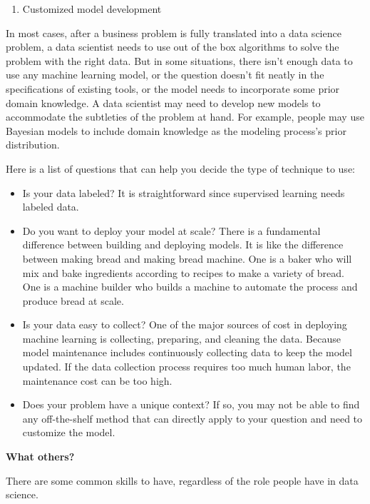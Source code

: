 \documentclass[12pt,]{krantz}
\providecommand{\tightlist}{%
  \setlength{\itemsep}{0pt}\setlength{\parskip}{0pt}}
\begin{document}
\begin{enumerate}
\def\labelenumi{(\arabic{enumi})}
\setcounter{enumi}{2}
\tightlist
\item
  Customized model development
\end{enumerate}

In most cases, after a business problem is fully translated into a data science problem, a data scientist needs to use out of the box algorithms to solve the problem with the right data. But in some situations, there isn't enough data to use any machine learning model, or the question doesn't fit neatly in the specifications of existing tools, or the model needs to incorporate some prior domain knowledge. A data scientist may need to develop new models to accommodate the subtleties of the problem at hand. For example, people may use Bayesian models to include domain knowledge as the modeling process's prior distribution.

Here is a list of questions that can help you decide the type of technique to use:

\begin{itemize}
\item
  Is your data labeled? It is straightforward since supervised learning needs labeled data.
\item
  Do you want to deploy your model at scale? There is a fundamental difference between building and deploying models. It is like the difference between making bread and making bread machine. One is a baker who will mix and bake ingredients according to recipes to make a variety of bread. One is a machine builder who builds a machine to automate the process and produce bread at scale.
\item
  Is your data easy to collect? One of the major sources of cost in deploying machine learning is collecting, preparing, and cleaning the data. Because model maintenance includes continuously collecting data to keep the model updated. If the data collection process requires too much human labor, the maintenance cost can be too high.
\item
  Does your problem have a unique context? If so, you may not be able to find any off-the-shelf method that can directly apply to your question and need to customize the model.
\end{itemize}

\textbf{What others?}

There are some common skills to have, regardless of the role people have in data science.
\end{document}
